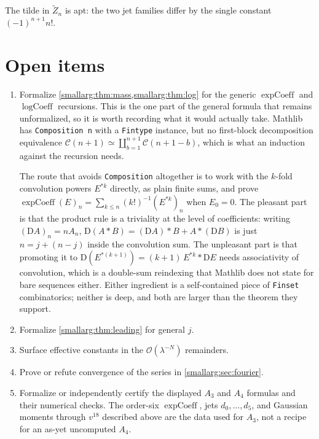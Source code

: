 \documentclass[11pt,oneside]{article}
\theoremstyle{definition}
\theoremstyle{remark}
\newcommand{\bigO}{\mathcal O}
\begin{document}
The tilde in $\widetilde Z_n$ is apt: the two jet families differ by the
single constant $(-1)^{n+1}n!$.

\section{Open items}\label{smallarg:sec:open}

\begin{enumerate}
\item Formalize \cref{smallarg:thm:mass,smallarg:thm:log} for the generic
  $\operatorname{expCoeff}$ and $\operatorname{logCoeff}$ recursions.  This is
  the one part of the general formula that remains unformalized, so it is
  worth recording what it would actually take.  Mathlib has
  \texttt{Composition n} with a \texttt{Fintype} instance, but no first-block
  decomposition equivalence
  $\mathcal C(n+1)\simeq\coprod_{b=1}^{n+1}\mathcal C(n+1-b)$, which is what
  an induction against the recursion needs.

  The route that avoids \texttt{Composition} altogether is to work with the
  $k$-fold convolution powers $E^{*k}$ directly, as plain finite sums, and
  prove $\operatorname{expCoeff}(E)_n=\sum_{k\le n}(k!)^{-1}(E^{*k})_n$ when
  $E_0=0$.  The pleasant part is that the product rule is a triviality at the
  level of coefficients: writing $(\mathrm DA)_n=nA_n$,
  $\mathrm D(A*B)=(\mathrm DA)*B+A*(\mathrm DB)$ is just $n=j+(n-j)$ inside
  the convolution sum.  The unpleasant part is that promoting it to
  $\mathrm D(E^{*(k+1)})=(k+1)\,E^{*k}*\mathrm DE$ needs associativity of
  convolution, which is a double-sum reindexing that Mathlib does not state
  for bare sequences either.  Either ingredient is a self-contained piece of
  \texttt{Finset} combinatorics; neither is deep, and both are larger than the
  theorem they support.
\item Formalize \cref{smallarg:thm:leading} for general $j$.
\item Surface effective constants in the $\bigO(\lambda^{-N})$ remainders.
\item Prove or refute convergence of the series in \cref{smallarg:sec:fourier}.
\item Formalize or independently certify the displayed \(A_3\) and \(A_4\)
  formulas and their numerical checks.  The order-six
  \(\operatorname{expCoeff}\), jets \(d_0,\dots,d_5\), and Gaussian moments
  through \(v^{18}\) described above are the data used for \(A_3\), not a recipe
  for an as-yet uncomputed \(A_4\).
\end{enumerate}
\end{document}
